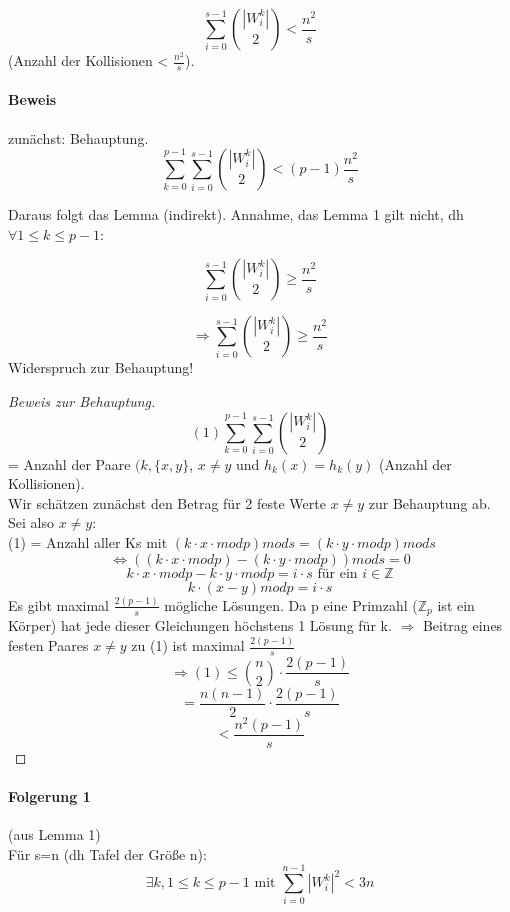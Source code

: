 \documentclass[ngerman]{scrartcl}
\begin{document}
$$ \sum_{i=0}^{s-1} \binom{|W_i^k|}{2} < \frac{n^2}{s}$$
(Anzahl der Kollisionen < $\frac{n^2}{s}$). \\

\paragraph{Beweis} zunächst: Behauptung.
$$ \sum_{k=0}^{p-1} \sum_{i=0}^{s-1} \binom{|W_i^k|}{2} <  (p-1)\frac{n^2}{s}$$

Daraus folgt das Lemma (indirekt). Annahme, das Lemma 1 gilt nicht, dh $\forall 1\leq k\leq p-1: $

$$ \sum_{i=0}^{s-1} \binom{|W_i^k|}{2} \geq \frac{n^2}{s}$$

$$ \Rightarrow  \sum_{i=0}^{s-1} \binom{|W_i^k|}{2} \geq \frac{n^2}{s}$$
Widerspruch zur Behauptung!

\begin{proof}[Beweis zur Behauptung]

$$ (1)\sum_{k=0}^{p-1} \sum_{i=0}^{s-1} \binom{|W_i^k|}{2}$$
= Anzahl der Paare $ (k, \{x,y\} $, $ x\neq y$ und $ h_k(x) = h_k(y) $ (Anzahl der Kollisionen).\\
Wir schätzen zunächst den Betrag für 2 feste Werte $ x \neq y $ zur Behauptung ab.\\

Sei also $ x \neq y $: \\
(1) = Anzahl aller Ks mit $ (k\cdot x\cdot mod p)mods = (k \cdot y\cdot modp)mods $
\[ \Leftrightarrow ((k\cdot x\cdot mod p)-(k\cdot y\cdot mod p))mods = 0 \]
\[ k\cdot x\cdot mod p - k\cdot y\cdot mod p = i \cdot s \text{ für ein } i\in \mathbb{Z} \]
\[k\cdot (x-y) mod p = i\cdot s \]
Es gibt maximal $ \frac{2(p-1)}{s} $ mögliche Lösungen. Da p eine Primzahl ($ \mathbb{Z}_p $ ist ein Körper) hat jede dieser Gleichungen höchstens 1 Lösung für k.
$ \Rightarrow $ Beitrag eines festen Paares $ x \neq y $ zu (1) ist maximal $ \frac{2(p-1)}{s} $ \\

\[ \Rightarrow (1) \leq \binom{n}{2} \cdot \frac{2(p-1)}{s}\]
\[ = \frac{n(n-1)}{2} \cdot \frac{2(p-1)}{s}\]
\[ < \frac{n^2(p-1)}{s}\]

\end{proof}

\paragraph{Folgerung 1} (aus Lemma 1) \\
Für s=n (dh Tafel der Größe n): 
$$\exists k ,1 \leq k \leq p-1 \text{ mit } \sum_{i=0}^{n-1} |W_i^k|^2 < 3n$$
\end{document}
